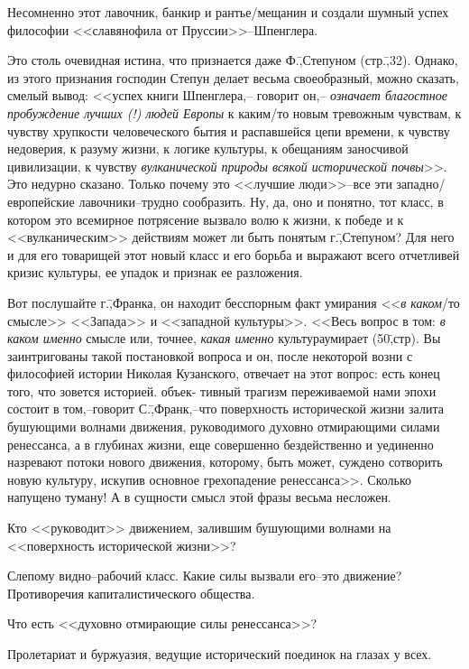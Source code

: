 Несомненно этот лавочник, банкир и рантье\-/мещанин и создали шумный успех философии <<славянофила от Пруссии>>\---Шпенглера.

Это столь очевидная истина, что признается даже Ф.\=,Степуном (стр.\=,32). Однако, из этого признания господин Степун делает весьма своеобразный, можно сказать, смелый вывод: <<успех книги Шпенглера,\--- говорит он,\--- \emph{означает благостное пробуждение лучших (!) людей Европы} к каким\-/то новым тревожным чувствам, к чувству хрупкости человеческого бытия и \glqq распавшейся цепи времени\grqq, к чувству недоверия, к разуму жизни, к логике культуры, к обещаниям заносчивой цивилизации, к чувству \emph{вулканической природы всякой исторической почвы}>>. Это недурно сказано. Только почему это <<лучшие люди>>\---все эти западно\-/европейские лавочники\---трудно сообразить. Ну, да, оно и понятно, тот класс, в котором это всемирное потрясение вызвало волю к жизни, к победе и к <<вулканическим>> действиям может ли быть понятым г.\=,Степуном? Для него и для его товарищей этот новый класс и его борьба и выражают всего отчетливей кризис культуры, ее упадок и признак ее разложения.

Вот послушайте г.\=,Франка, он находит бесспорным факт умирания <<\emph{в каком}\-/то смысле>> <<Запада>> и <<западной культуры>>. <<Весь вопрос в том: \emph{в каком именно} смысле или, точнее, \emph{какая именно}  культура\grqq умирает (50\=,стр). Вы заинтригованы такой постановкой вопроса и он, после некоторой возни с философией истории Николая Кузанского, отвечает на этот вопрос:  есть конец того, что зовется  историей\grqq.  объек- тивный трагизм переживаемой нами эпохи состоит в том,\---говорит С.\=,Франк,\---что поверхность исторической жизни залита бушующими волнами движения, руководимого духовно отмирающими силами ренессанса, а в глубинах жизни, еще совершенно бездейственно и уединенно назревают потоки нового движения, которому, быть может, суждено сотворить новую культуру, искупив основное грехопадение ренессанса>>. Сколько напущено туману! А в сущности смысл этой фразы весьма несложен.

Кто <<руководит>> движением, залившим бушующими волнами на <<поверхность исторической жизни>>?

Слепому видно\---рабочий класс. Какие силы вызвали его\---это движение? Противоречия капиталистического общества.

Что есть <<духовно отмирающие силы ренессанса>>?

Пролетариат и буржуазия, ведущие исторический поединок на глазах у всех.

